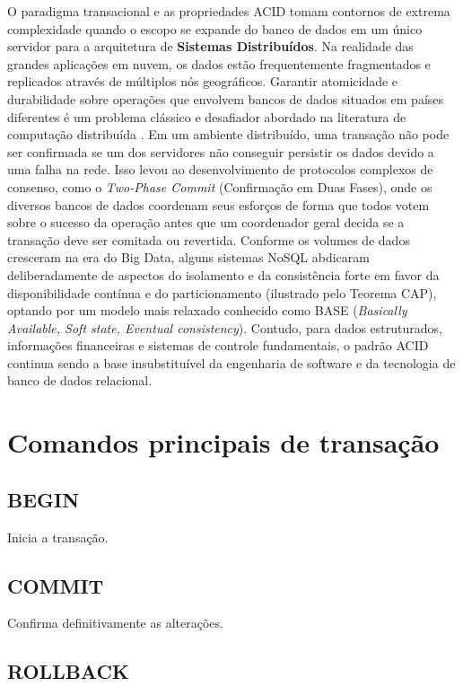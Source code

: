 O paradigma transacional e as propriedades ACID tomam contornos de extrema complexidade quando o escopo se expande do banco de dados em um único servidor para a arquitetura de \textbf{Sistemas Distribuídos}. Na realidade das grandes aplicações em nuvem, os dados estão frequentemente fragmentados e replicados através de múltiplos nós geográficos. Garantir atomicidade e durabilidade sobre operações que envolvem bancos de dados situados em países diferentes é um problema clássico e desafiador abordado na literatura de computação distribuída \cite{tanenbaum2023sistemas}. Em um ambiente distribuído, uma transação não pode ser confirmada se um dos servidores não conseguir persistir os dados devido a uma falha na rede. Isso levou ao desenvolvimento de protocolos complexos de consenso, como o \textit{Two-Phase Commit} (Confirmação em Duas Fases), onde os diversos bancos de dados coordenam seus esforços de forma que todos votem sobre o sucesso da operação antes que um coordenador geral decida se a transação deve ser comitada ou revertida. Conforme os volumes de dados cresceram na era do Big Data, alguns sistemas NoSQL abdicaram deliberadamente de aspectos do isolamento e da consistência forte em favor da disponibilidade contínua e do particionamento (ilustrado pelo Teorema CAP), optando por um modelo mais relaxado conhecido como BASE (\textit{Basically Available, Soft state, Eventual consistency}). Contudo, para dados estruturados, informações financeiras e sistemas de controle fundamentais, o padrão ACID continua sendo a base insubstituível da engenharia de software e da tecnologia de banco de dados relacional.

\section{Comandos principais de transação}

\subsection{BEGIN}

Inicia a transação.

\subsection{COMMIT}

Confirma definitivamente as alterações.

\subsection{ROLLBACK}

